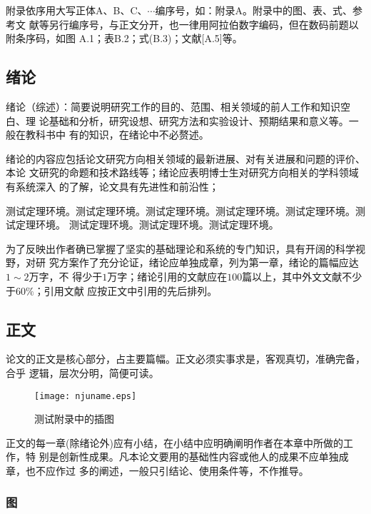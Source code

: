 \documentclass[master]{njuthesis}
\begin{document}
\begin{enumerate}
\begin{enumerate}
\begin{enumerate}
\begin{enumerate}
附录依序用大写正体A、B、C、$\cdots$编序号，如：附录A。附录中的图、表、式、参考文
献等另行编序号，与正文分开，也一律用阿拉伯数字编码，但在数码前题以附条序码，如图
A.1；表B.2；式(B.3)；文献[A.5]等。

\subsection{绪论}

绪论（综述）：简要说明研究工作的目的、范围、相关领域的前人工作和知识空白、理
论基础和分析，研究设想、研究方法和实验设计、预期结果和意义等。一般在教科书中
有的知识，在绪论中不必赘述。

绪论的内容应包括论文研究方向相关领域的最新进展、对有关进展和问题的评价、本论
文研究的命题和技术路线等；绪论应表明博士生对研究方向相关的学科领域有系统深入
的了解，论文具有先进性和前沿性；

\begin{problem}
测试定理环境。测试定理环境。测试定理环境。测试定理环境。测试定理环境。测试定理环境。
测试定理环境。测试定理环境。测试定理环境。
\end{problem}

为了反映出作者确已掌握了坚实的基础理论和系统的专门知识，具有开阔的科学视野，对研
究方案作了充分论证，绪论应单独成章，列为第一章，绪论的篇幅应达$1\sim 2$万字，不
得少于$1$万字；绪论引用的文献应在$100$篇以上，其中外文文献不少于$60\%$；引用文献
应按正文中引用的先后排列。

\subsection{正文}

论文的正文是核心部分，占主要篇幅。正文必须实事求是，客观真切，准确完备，合乎
逻辑，层次分明，简便可读。

\begin{figure}[htbp]
  \centering
  \texttt{[image: njuname.eps]}\\
  \caption{测试附录中的插图}\label{fig:appendix2}
\end{figure}

正文的每一章(除绪论外)应有小结，在小结中应明确阐明作者在本章中所做的工作，特
别是创新性成果。凡本论文要用的基础性内容或他人的成果不应单独成章，也不应作过
多的阐述，一般只引结论、使用条件等，不作推导。

\subsubsection{图}


\end{enumerate}
\end{enumerate}
\end{enumerate}
\end{enumerate}
\end{document}
